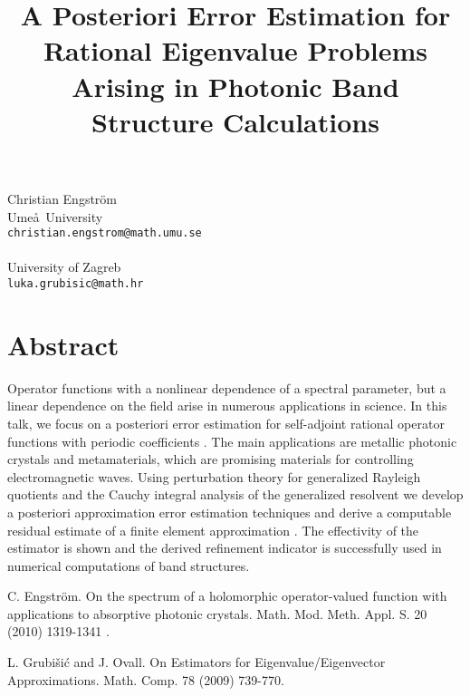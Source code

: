 \title{A Posteriori Error Estimation for Rational Eigenvalue Problems Arising in Photonic Band Structure Calculations}
 \author{} \institute{}
\maketitle
\begin{center}
{\large Christian  Engstr\"om}\\
Ume\aa\, University\\
{\tt christian.engstrom@math.umu.se}
\\ \\
University of Zagreb\\
{\tt luka.grubisic@math.hr}

\end{center}

\section*{Abstract}

Operator functions with a nonlinear dependence of a spectral parameter, but a linear dependence on the field arise in numerous applications in science. In this talk, we focus on a posteriori error estimation for self-adjoint rational operator functions with periodic coefficients \cite{Eng1}. The main applications are metallic photonic crystals and metamaterials, which are promising materials for controlling electromagnetic waves. Using perturbation theory for generalized Rayleigh quotients and the Cauchy integral analysis of the generalized resolvent we develop a posteriori approximation error estimation techniques and derive a computable residual estimate of a finite element approximation \cite{Luk1}. The effectivity of the estimator is shown and the derived refinement indicator is successfully used in numerical computations of band structures. 


\begin{thebibliography}{10}

{\sc C. Engstr\"om}. {On the spectrum of a holomorphic operator-valued function with applications to absorptive photonic crystals}. Math. Mod. Meth. Appl. S. 20 (2010) 1319-1341 .



{\sc L. Grubi\v{s}i\'c and J. Ovall}. {On Estimators for Eigenvalue/Eigenvector Approximations}. Math. Comp. 78 (2009) 739-770.

\end{thebibliography}
